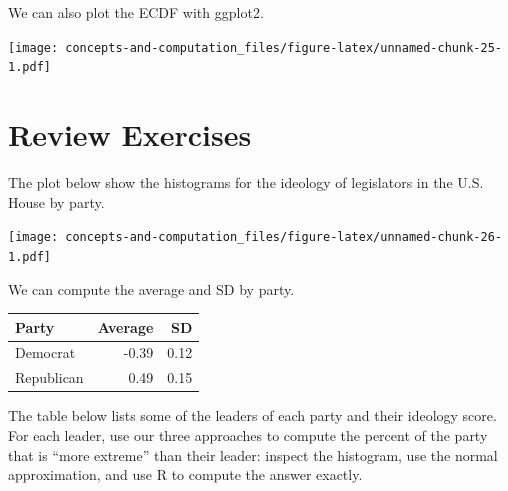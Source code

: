 \documentclass[]{book}
\begin{document}
We can also plot the ECDF with ggplot2.

\texttt{[image: concepts-and-computation\_files/figure-latex/unnamed-chunk-25-1.pdf]}

\hypertarget{review-exercises}{%
\section{Review Exercises}\label{review-exercises}}

The plot below show the histograms for the ideology of legislators in the U.S. House by party.

\texttt{[image: concepts-and-computation\_files/figure-latex/unnamed-chunk-26-1.pdf]}

We can compute the average and SD by party.

\begin{longtable}[]{@{}lrr@{}}
\toprule
Party & Average & SD\tabularnewline
\midrule
\endhead
Democrat & -0.39 & 0.12\tabularnewline
Republican & 0.49 & 0.15\tabularnewline
\bottomrule
\end{longtable}

The table below lists some of the leaders of each party and their ideology score. For each leader, use our three approaches to compute the percent of the party that is ``more extreme'' than their leader: inspect the histogram, use the normal approximation, and use R to compute the answer exactly.
\end{document}
